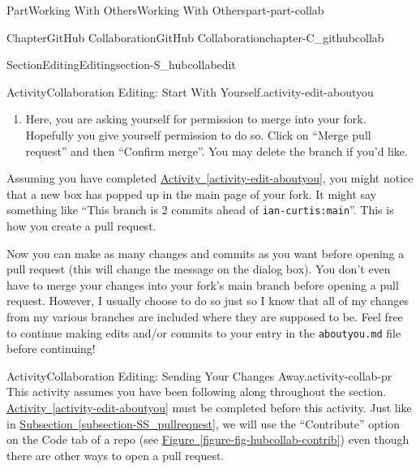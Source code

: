 \documentclass[oneside,10pt,]{book}
\newcommand{\xreffont}{\relax}
\newcommand{\mono}[1]{\texttt{#1}}
\begin{document}
\begin{partptx}{Part}{Working With Others}{}{Working With Others}{}{}{part-part-collab}
\begin{chapterptx}{Chapter}{GitHub Collaboration}{}{GitHub Collaboration}{}{}{chapter-C_githubcollab}
\begin{sectionptx}{Section}{Editing}{}{Editing}{}{}{section-S_hubcollabedit}
\begin{activity}{Activity}{Collaboration Editing: Start With Yourself.}{activity-edit-aboutyou}
\begin{enumerate}[font=\bfseries,label=(\alph*),ref=\alph*]
\begin{quote}
\mono{base: main} \faArrowLeft{} \mono{compare: <your-branch-name>}.%
\end{quote}
This means that you are taking your branch and attempting to merge your changes into the main branch from the ``base'' repository, or \emph{your repo}.%
\par
Like before, if you scroll down, you can see all of the changes you made. Later, I will be able to see this too, to make sure that you only changed what you were supposed to and didn't write anything R-rated.%
\par
Now you can create the pull request.%
\item{}Here, you are asking yourself for permission to merge into your fork. Hopefully you give yourself permission to do so. Click on ``Merge pull request'' and then ``Confirm merge''. You may delete the branch if you'd like.%
\end{enumerate}%
\end{activity}%
Assuming you have completed \hyperref[activity-edit-aboutyou]{Activity~{\xreffont\ref{activity-edit-aboutyou}}}, you might notice that a new box has popped up in the main page of your fork. It might say something like ``This branch is 2 commits ahead of \mono{ian-curtis:main}''. This is how you create a pull request.%
\par
Now you can make as many changes and commits as you want before opening a pull request (this will change the message on the dialog box). You don't even have to merge your changes into your fork's main branch before opening a pull request. However, I usually choose to do so just so I know that all of my changes from my various branches are included where they are supposed to be. Feel free to continue making edits and\slash{}or commits to your entry in the \mono{aboutyou.md} file before continuing!%
\begin{activity}{Activity}{Collaboration Editing: Sending Your Changes Away.}{activity-collab-pr}%
%
%
%
%
%
%
This activity assumes you have been following along throughout the section. \hyperref[activity-edit-aboutyou]{Activity~{\xreffont\ref{activity-edit-aboutyou}}} must be completed before this activity. Just like in \hyperref[subsection-SS_pullrequest]{Subsection~{\xreffont\ref{subsection-SS_pullrequest}}}, we will use the ``Contribute'' option on the Code tab of a repo (see \hyperref[figure-fig-hubcollab-contrib]{Figure~{\xreffont\ref{figure-fig-hubcollab-contrib}}}) even though there are other ways to open a pull request.%

\end{activity}
\end{sectionptx}
\end{chapterptx}
\end{partptx}
\end{document}
